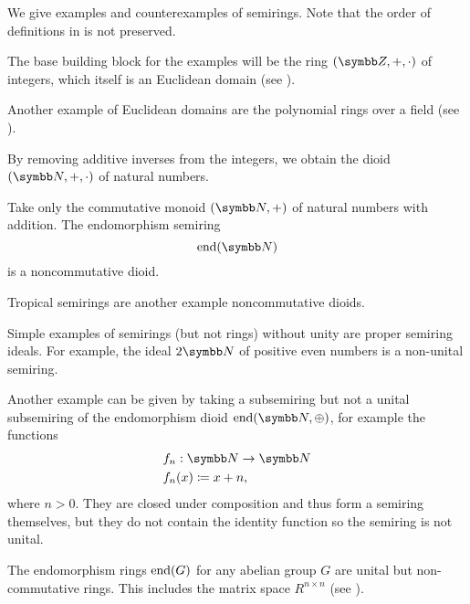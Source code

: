 \begin{example}\label{ex:semirings}
  We give examples and counterexamples of semirings. Note that the order of definitions in  is not preserved.

  \begin{description}
     The base building block for the examples will be the ring \( (\BZ, +, \cdot) \) of integers, which itself is an Euclidean domain (see ).

    Another example of Euclidean domains are the polynomial rings over a field (see ).

     By removing additive inverses from the integers, we obtain the dioid \( (\BN, +, \cdot) \) of natural numbers.

    Take only the commutative monoid \( (\BN, +) \) of natural numbers with addition. The endomorphism semiring
    \begin{equation*}
      \End(\BN)
    \end{equation*}
    is a noncommutative dioid.

    Tropical semirings are another example noncommutative dioids.

     Simple examples of semirings (but not rings) without unity are proper semiring ideals. For example, the ideal \( 2\BN \) of positive even numbers is a non-unital semiring.

    Another example can be given by taking a subsemiring but not a unital subsemiring of the endomorphism dioid \( \End(\BN, \oplus) \), for example the functions
    \begin{align*}
      &f_n: \BN \to \BN \\
      &f_n(x) \coloneqq x + n,
    \end{align*}
    where \( n > 0 \). They are closed under composition and thus form a semiring themselves, but they do not contain the identity function so the semiring is not unital.

     The endomorphism rings \( \operatorname{end}(G) \) for any abelian group \( G \) are unital but non-commutative rings. This includes the matrix space \( R^{n \times n} \) (see ).


\end{description}
\end{example}
